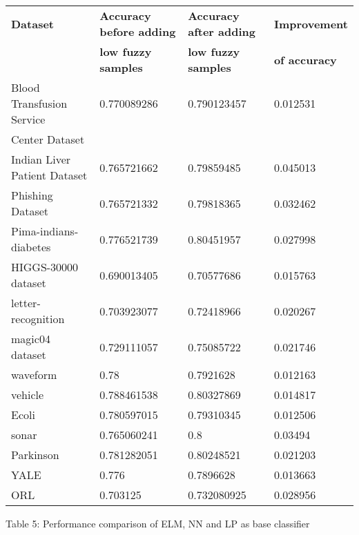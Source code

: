 \documentclass{article}
\begin{document}
		\begin{center}
			\textcolor{blue}{
				\begin{tabular}{l|l|l|l}
					\hline
					\textbf{Dataset} & \textbf{Accuracy before adding} & \textbf{Accuracy after adding} & \textbf{Improvement}\\
					& \textbf{low fuzzy samples} & \textbf{low fuzzy samples} & \textbf{of accuracy}\\
					\hline
					\hline
					Blood Transfusion Service & 0.770089286 & 0.790123457 & 0.012531 \\
					Center Dataset &  &  &  \\
					\hline
					Indian Liver Patient Dataset & 0.765721662 & 0.79859485 & 0.045013\\
					\hline
					Phishing Dataset & 0.765721332 & 0.79818365 & 0.032462\\
					\hline
					Pima-indians-diabetes & 0.776521739 & 0.80451957 & 0.027998\\
					\hline
					HIGGS-30000 dataset & 0.690013405 & 0.70577686 & 0.015763\\
					\hline
					letter-recognition & 0.703923077 & 0.72418966 & 0.020267\\
					\hline
					magic04 dataset & 0.729111057 & 0.75085722 & 0.021746\\
					\hline
					waveform & 0.78 & 0.7921628 & 0.012163\\
					\hline
					vehicle & 0.788461538 & 0.80327869 & 0.014817\\
					\hline
					Ecoli & 0.780597015 & 0.79310345 & 0.012506\\
					\hline
					sonar & 0.765060241 & 0.8 & 0.03494\\
					\hline
					Parkinson & 0.781282051  & 0.80248521 & 0.021203\\
					\hline
					YALE & 0.776 & 0.7896628 & 0.013663\\
					\hline
					ORL & 0.703125 & 0.732080925 & 0.028956\\
					\hline
				\end{tabular}
			}
		\end{center}		
	
	
	
	
	
	\newpage
	
	\begin{center}
		\small Table 5: Performance comparison of ELM, NN and LP as base classifier
	\end{center}
	
\end{document}
